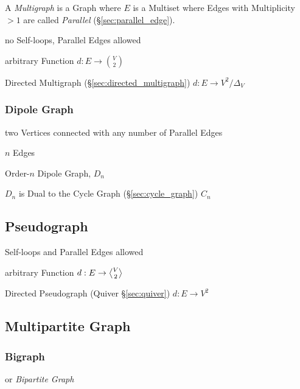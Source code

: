 A \emph{Multigraph} is a Graph where $E$ is a Multiset where Edges
with Multiplicity $>1$ are called \emph{Parallel}
(\S\ref{sec:parallel_edge}).

no Self-loops, Parallel Edges allowed

arbitrary Function $d : E \rightarrow {V \choose 2}$

Directed Multigraph (\S\ref{sec:directed_multigraph}) $d : E
\rightarrow V^2 / \Delta_V$



\subsubsection{Dipole Graph}\label{sec:dipole_graph}

two Vertices connected with any number of Parallel Edges

$n$ Edges

Order-$n$ Dipole Graph, $D_n$

$D_n$ is Dual to the Cycle Graph (\S\ref{sec:cycle_graph}) $C_n$



\subsection{Pseudograph}\label{sec:pseudograph}

Self-loops and Parallel Edges allowed

arbitrary Function $d : E \rightarrow \angleover{V}{2}$

Directed Pseudograph (Quiver \S\ref{sec:quiver}) $d : E \rightarrow
V^2$



\subsection{Multipartite Graph}\label{sec:multipartite_graph}

\subsubsection{Bigraph}\label{sec:bigraph}

or \emph{Bipartite Graph}



